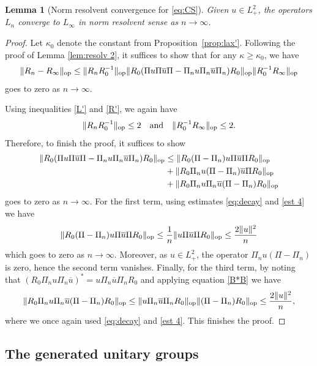 \documentclass [11pt] {article}
\newtheorem{lem}[thm]{Lemma}
\newcommand{\<}{\langle}
\renewcommand{\>}{\rangle}
\newcommand{\ol}[1]{\overline{#1}}
\newcommand{\op}{\textup{op}}
\begin{document}
\begin{lem}[Norm resolvent convergence for \eqref{eq:CS}]
\label{lem:resolv 2'}
Given $u\in L^2_+$, the operators $L_n$ converge to $L_\infty$ in norm resolvent sense as $n\to\infty$.
\end{lem}
\begin{proof}

Let $\kappa_0$ denote the constant from Proposition~\ref{prop:lax'}.
Following the proof of Lemma \ref{lem:resolv 2}, it suffices to show that for any $\kappa\geq\kappa_0$, we have
  \[
  \| R_n - R_{\infty}\|_{\op} \le \| R_{n}R_0^{-1}\|_{\op} \|R_0 (\Pi u\Pi\ol u \Pi  - \Pi_nu\Pi_n \ol u \Pi_n)R_0\|_{\op} \| R_{0}^{-1}R_{\infty}\|_\op
  \]
  goes to zero as $n\to \infty$.
  
  Using inequalities \eqref{L'} and \eqref{R'}, we again have
  \[
   \| R_{n}R_0^{-1}\|_{\op} \le 2 \quad \text{and} \quad \| R_{0}^{-1}R_{\infty}\|_\op \le 2.
  \]
Therefore, to finish the proof, it suffices to show
\begin{align*}
\| R_0 (\Pi u\Pi\ol u \Pi  - \Pi_nu\Pi_n \ol u \Pi_n)R_0 \|_{\op} &\le  \|R_0(\Pi-\Pi_n) u \Pi \ol u \Pi R_0 \|_{\op} \\
&+ \| R_0\Pi_n u (\Pi-\Pi_n) \ol u \Pi R_0 \|_{\op}\\
&+\| R_0\Pi_n  u \Pi_n \ol u (\Pi-\Pi_n) R_0 \|_{\op}
\end{align*}
goes to zero as $n \rightarrow \infty$.
%
For the first term, using estimates \eqref{eq:decay} and \eqref{est 4}  we have
\[
\|R_0(\Pi-\Pi_n) u \Pi \ol u \Pi R_0 \|_{\op} \le \frac{1}{n}\| u \Pi \ol u \Pi R_0\|_{\op} \le \frac{2\| u\|^2}{n}
\]
which goes to zero as $n \to \infty$. Moreover, as $u\in L^2_+$, the operator $\Pi_n u(\Pi-\Pi_n)$ is zero, hence the second term vanishes.
Finally, for the third term, by noting that $(R_0\Pi_n  u \Pi_n \ol u)^* = u \Pi_n \ol u \Pi_n R_0$ and applying equation \eqref{B*B} we have
\[
\| R_0\Pi_n  u \Pi_n \ol u (\Pi-\Pi_n) R_0 \|_{\op} \le \| u \Pi_n \ol u \Pi_n R_0\|_{\op}\| (\Pi-\Pi_n) R_0 \|_{\op} 
\le \frac{2\| u\|^2}{n},
\]
where we once again used \eqref{eq:decay} and \eqref{est 4}. This finishes the proof.
\end{proof}






\subsection{The generated unitary groups}\label{sec:cv-group}
\end{document}
